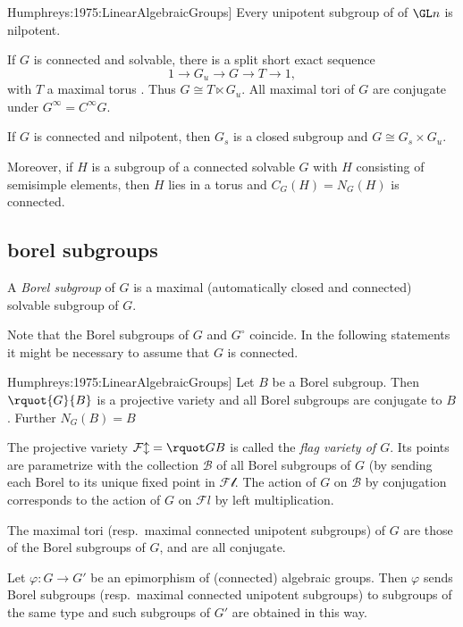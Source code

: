 \documentclass[english, no-theorem-numbers]{short-notes}
\newcommand\Humph[1]{\cite[#1]{Humphreys:1975:LinearAlgebraicGroups}}
\newcommand\conn{\circ}
\begin{document}
\begin{Thm}[\Humph{Cor.~17.5}]
    Every unipotent subgroup of of $\GL n$ is nilpotent.
\end{Thm}

If $G$ is connected and solvable, there is a split short exact sequence 
\[
    1 → G_u → G → T → 1,
\]
with $T$ a maximal torus \Humph{Thm.~19.3}. 
Thus $G \cong T ⋉ G_u$.
All maximal tori of $G$ are conjugate under $G^∞ = C^∞G$.

If $G$ is connected and nilpotent, then $G_s$ is a closed subgroup and $G \cong G_s × G_u$.

Moreover, if $H$ is a subgroup of a connected solvable $G$ with $H$ consisting of semisimple elements, then $H$ lies in a torus and $C_G(H) = N_G(H)$ is connected.

\subsection*{borel subgroups}

\begin{Def}
    A \emph{Borel subgroup} of $G$ is a maximal (automatically closed and connected) solvable subgroup of $G$.
\end{Def}

Note that the Borel subgroups of $G$ and $G^\conn$ coincide.
In the following statements it might be necessary to assume that $G$ is connected.

\begin{Thm}[\Humph{Thm.~21.3 and Thm.~23.1}]
    Let $B$ be a Borel subgroup.
    Then $\rquot{G}{B}$ is a projective variety and all Borel subgroups are conjugate to $B$.
    Further $N_G(B) = B$
\end{Thm}

The projective variety $\mathcal{Fl} = \rquot GB$ is called the \emph{flag variety of $G$}.
Its points are parametrize with the collection $\mathcal B$ of all Borel subgroups of $G$ (by sending each Borel to its unique fixed point in $\mathcal{Fl}$.
The action of $G$ on $\mathcal B$ by conjugation corresponds to the action of $G$ on $\mathcal Fl$ by left multiplication.

The maximal tori (resp.~maximal connected unipotent subgroups) of $G$ are those of the Borel subgroups of $G$, and are all conjugate.

\begin{Prop}
    Let $φ\colon G → G'$ be an epimorphism of (connected) algebraic groups.
    Then $φ$ sends Borel subgroups (resp.~maximal connected unipotent subgroups) to subgroups of the same type and such subgroups of $G'$ are obtained in this way.
\end{Prop}
\end{document}
